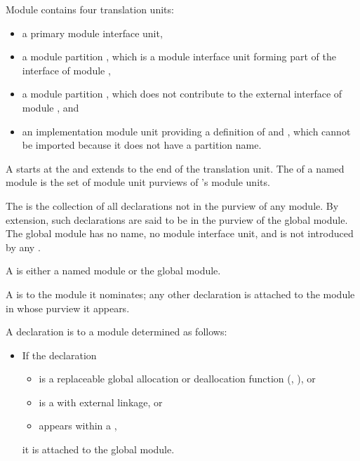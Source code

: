 \begin{std.txt}
\begin{after}
\begin{example}
Module  contains four translation units:
\begin{itemize}
\item a primary module interface unit,
\item a module partition , which is a module interface unit
forming part of the interface of module ,
\item a module partition , which does not contribute
to the external interface of module , and
\item an implementation module unit providing
a definition of  and ,
which cannot be imported because
it does not have a partition name.
\end{itemize}
\end{example}
\end{after}

\alinea
A  starts at the 
and extends to the end of the translation unit.
The  of a named module  is the set of module unit purviews
of 's module units. 

\alinea
The  is the collection of all declarations
not in the purview of any module.   By
extension, such declarations  are said to be in the purview of the
global module. 
\enternote
The global module has no name, no module interface unit, and is not
introduced by any .
\exitnote

\alinea
  A  is either a named module or the global module.
  \begin{before}\color{addclr}
  A  is
   to the module it nominates; any other declaration
  is attached to the module in whose purview it appears.
  \end{before}
  \begin{after}\color{addclr}
  A declaration is  to a module determined as follows:
  \begin{itemize}\color{addclr}
  \item If the declaration
  \begin{itemize}\color{addclr}
  \item is a replaceable global allocation or deallocation
  function (, ), or
  \item is a  with external linkage, or
  \item appears within a ,
  \end{itemize}\color{addclr}
  it is attached to the global module.


\end{itemize}
\end{after}
\end{std.txt}
